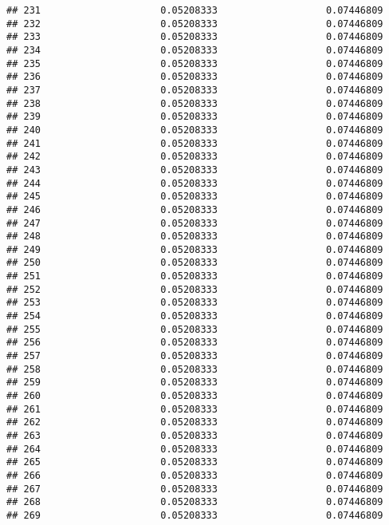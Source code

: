 \documentclass[]{article}
\begin{document}
\begin{verbatim}
## 231                     0.05208333                   0.07446809
## 232                     0.05208333                   0.07446809
## 233                     0.05208333                   0.07446809
## 234                     0.05208333                   0.07446809
## 235                     0.05208333                   0.07446809
## 236                     0.05208333                   0.07446809
## 237                     0.05208333                   0.07446809
## 238                     0.05208333                   0.07446809
## 239                     0.05208333                   0.07446809
## 240                     0.05208333                   0.07446809
## 241                     0.05208333                   0.07446809
## 242                     0.05208333                   0.07446809
## 243                     0.05208333                   0.07446809
## 244                     0.05208333                   0.07446809
## 245                     0.05208333                   0.07446809
## 246                     0.05208333                   0.07446809
## 247                     0.05208333                   0.07446809
## 248                     0.05208333                   0.07446809
## 249                     0.05208333                   0.07446809
## 250                     0.05208333                   0.07446809
## 251                     0.05208333                   0.07446809
## 252                     0.05208333                   0.07446809
## 253                     0.05208333                   0.07446809
## 254                     0.05208333                   0.07446809
## 255                     0.05208333                   0.07446809
## 256                     0.05208333                   0.07446809
## 257                     0.05208333                   0.07446809
## 258                     0.05208333                   0.07446809
## 259                     0.05208333                   0.07446809
## 260                     0.05208333                   0.07446809
## 261                     0.05208333                   0.07446809
## 262                     0.05208333                   0.07446809
## 263                     0.05208333                   0.07446809
## 264                     0.05208333                   0.07446809
## 265                     0.05208333                   0.07446809
## 266                     0.05208333                   0.07446809
## 267                     0.05208333                   0.07446809
## 268                     0.05208333                   0.07446809
## 269                     0.05208333                   0.07446809

\end{verbatim}
\end{document}
